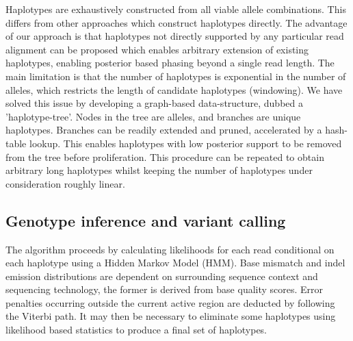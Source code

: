 \documentclass[notitlepage, twocolumn]{article}
\begin{document}
Haplotypes are exhaustively constructed from all viable allele combinations. This differs from other approaches which construct haplotypes directly. The advantage of our approach is that haplotypes not directly supported by any particular read alignment can be proposed which enables arbitrary extension of existing haplotypes, enabling posterior based phasing beyond a single read length. The main limitation is that the number of haplotypes is exponential in the number of alleles, which restricts the length of candidate haplotypes (windowing). We have solved this issue by developing a graph-based data-structure, dubbed a 'haplotype-tree'. Nodes in the tree are alleles, and branches are unique haplotypes. Branches can be readily extended and pruned, accelerated by a hash-table lookup. This enables haplotypes with low posterior support to be removed from the tree before proliferation. This procedure can be repeated to obtain arbitrary long haplotypes whilst keeping the number of haplotypes under consideration roughly linear.

\subsection*{Genotype inference and variant calling}

The algorithm proceeds by calculating likelihoods for each read conditional on each haplotype using a Hidden Markov Model (HMM). Base mismatch and indel emission distributions are dependent on surrounding sequence context and sequencing technology, the former is derived from base quality scores. Error penalties occurring outside the current active region are deducted by following the Viterbi path. It may then be necessary to eliminate some haplotypes using likelihood based statistics to produce a final set of haplotypes.
\end{document}
